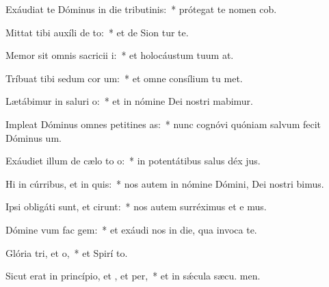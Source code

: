 \item Exáudiat te Dóminus in die tributinis:~* prótegat te nomen  cob.
\item Mittat tibi auxíli de to:~* et de Sion tur te.
\item Memor sit omnis sacricii i:~* et holocáustum tuum  at.
\item Tríbuat tibi sedum cor um:~* et omne consílium tu met.
\item Lætábimur in saluri o:~* et in nómine Dei nostri mabimur.
\item Impleat Dóminus omnes petitines as:~* nunc cognóvi quóniam salvum fecit Dóminus  um.
\item Exáudiet illum de cælo to o:~* in potentátibus salus déx jus.
\item Hi in cúrribus, et  in quis:~* nos autem in nómine Dómini, Dei nostri bimus.
\item Ipsi obligáti sunt, et cirunt:~* nos autem surréximus et e mus.
\item Dómine vum fac gem:~* et exáudi nos in die, qua invoca te.
\item Glória tri, et o,~* et Spirí to.
\item Sicut erat in princípio, et , et per,~* et in sǽcula sæcu. men.
